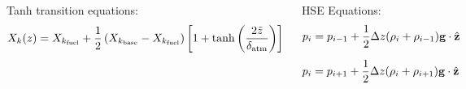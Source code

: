 \documentclass[
	11pt, %
]{beamer}
\begin{document}
\begin{frame}[allowframebreaks]
\begin{columns}
\begin{block}{Tanh transition equations:}
                \begin{equation}
                    \scriptsize X_k(z) = X_{k_{\mathrm{fuel}}} + \frac{1}{2}\left(X_{k_{\mathrm{base}}} - X_{k_\mathrm{fuel}}\right)\left[1 + \tanh{\left( \frac{2\tilde{z}}{\delta_{\mathrm{atm}}} \right)}\right]
                \end{equation}
    	    \end{block}

            \begin{block}{HSE Equations:}
                \begin{equation}
                    \scriptsize p_i = p_{i-1} + \frac{1}{2}\Delta z( \rho_i + \rho_{i-1})\mathbf{g} \cdot \hat{\mathbf{z}}
                \end{equation}
            
                \begin{equation}
                    \scriptsize p_i = p_{i+1} + \frac{1}{2}\Delta z( \rho_i + \rho_{i+1})\mathbf{g} \cdot \hat{\mathbf{z}}
                \end{equation}
            \end{block}

    \end{columns}

    

\end{frame}
\end{document}

